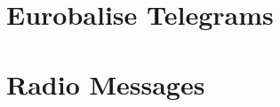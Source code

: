 \documentclass[paper=a4,12pt,DIV16,BCOR8mm,twoside]{scrreprt}
\begin{document}
\chapter{Eurobalise Telegrams}
\chapter{Radio Messages}

\cleardoublepage

%
 

%
%
\end{document}
